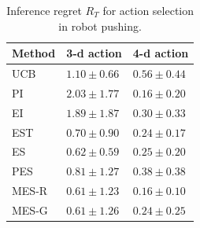 \begin{table}[t]
\caption{Inference regret $R_T$ for action selection in robot pushing.}
\label{tb:robot}
\vskip -0.5in
\begin{center}
\begin{small}
\begin{sc}
\begin{tabular}{lll}%
\hline
\abovespace\belowspace
Method & 3-d action & 4-d action \\
\hline
\abovespace
UCB & $1.10 \pm 0.66$ & $0.56 \pm 0.44$  \\
PI & $2.03 \pm 1.77$ & {\color{red}$0.16 \pm 0.20$}  \\
EI & $1.89 \pm 1.87$ & $0.30 \pm 0.33$  \\
EST & $0.70 \pm 0.90$ & $0.24 \pm 0.17$  \\
ES &  {\color{red}$0.62 \pm 0.59$} & $0.25 \pm 0.20$  \\
PES & $0.81 \pm 1.27$ & $0.38 \pm 0.38$  \\
MES-R & {\color{red}$0.61 \pm 1.23$} & {\color{red}$0.16 \pm 0.10$}  \\
\belowspace
MES-G & {\color{red}$0.61 \pm 1.26$} & $0.24 \pm 0.25$  \\
\hline
\end{tabular}
\end{sc}
\end{small}
\end{center}
\vskip -0.2in
\end{table}

